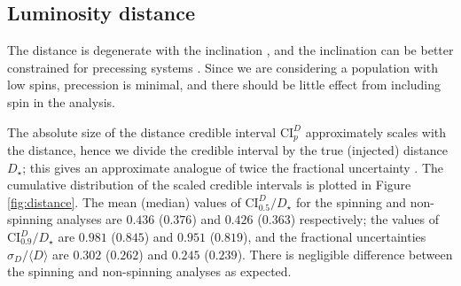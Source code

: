\subsection{Luminosity distance}\label{sec:distance}

The distance is degenerate with the inclination \citep{Cutler_1994,Aasi_2013}, and the inclination can be better constrained for precessing systems \citep{van_der_Sluys_2008,Vitale_2014}. Since we are considering a population with low spins, precession is minimal, and there should be little effect from including spin in the analysis.

The absolute size of the distance credible interval $\mathrm{CI}_p^{D}$ approximately scales with the distance, hence we divide the credible interval by the true (injected) distance $D_\star$; this gives an approximate analogue of twice the fractional uncertainty \citep{Berry_2014}. The cumulative distribution of the scaled credible intervals is plotted in Figure \ref{fig:distance}. The mean (median) values of $\mathrm{CI}_{0.5}^{D}/D_\star$ for the spinning and non-spinning analyses are $0.436$ ($0.376$) and $0.426$ ($0.363$) respectively; the values of $\mathrm{CI}_{0.9}^{D}/D_\star$ are $0.981$ ($0.845$) and $0.951$ ($0.819$), and the fractional uncertainties $\sigma_D/\langle D\rangle$ are $0.302$ ($0.262$) and $0.245$ ($0.239$). There is negligible difference between the spinning and non-spinning analyses as expected.


  
  
  
  
  
  